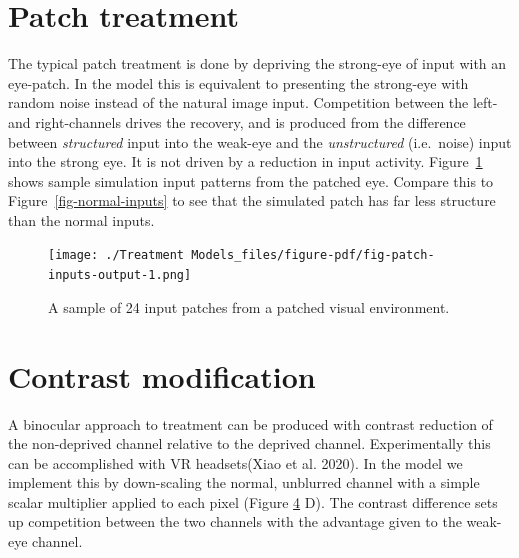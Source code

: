 \documentclass[
  letterpaper,
]{book}
\begin{document}
\hypertarget{patch-treatment}{%
\section{Patch treatment}\label{patch-treatment}}

The typical patch treatment is done by depriving the strong-eye of input
with an eye-patch. In the model this is equivalent to presenting the
strong-eye with random noise instead of the natural image input.
Competition between the left- and right-channels drives the recovery,
and is produced from the difference between \emph{structured} input into
the weak-eye and the \emph{unstructured} (i.e.~noise) input into the
strong eye. It is not driven by a reduction in input activity.
Figure~\ref{fig-patch-inputs} shows sample simulation input patterns
from the patched eye. Compare this to Figure~\ref{fig-normal-inputs} to
see that the simulated patch has far less structure than the normal
inputs.

\begin{figure}

{\centering \texttt{[image: ./Treatment Models\_files/figure-pdf/fig-patch-inputs-output-1.png]}

}

\caption{\label{fig-patch-inputs}A sample of 24 input patches from a
patched visual environment.}

\end{figure}

\hypertarget{contrast-modification}{%
\section{Contrast modification}\label{contrast-modification}}

A binocular approach to treatment can be produced with contrast
reduction of the non-deprived channel relative to the deprived channel.
Experimentally this can be accomplished with VR headsets(Xiao et al.
2020). In the model we implement this by down-scaling the normal,
unblurred channel with a simple scalar multiplier applied to each pixel
(Figure \protect\hyperlink{fig:input}{4} D). The contrast difference
sets up competition between the two channels with the advantage given to
the weak-eye channel.
\end{document}
